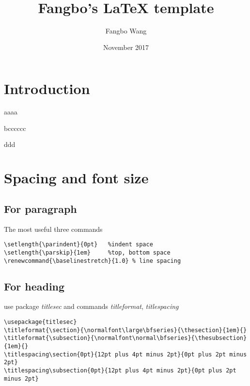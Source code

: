 \documentclass[12pt]{article}
\title{Fangbo's \LaTeX{} template}
\author{Fangbo Wang \\   }
\date{November 2017}
\renewcommand{\baselinestretch}{1.0} %
\begin{document}
\maketitle
\tableofcontents

\newpage
\section{Introduction}
aaaa 

bcccccc


ddd
\section{Spacing and font size}

\subsection{For paragraph}
The most useful three commands
\begin{lstlisting}
\setlength{\parindent}{0pt}   %indent space
\setlength{\parskip}{1em}     %top, bottom space
\renewcommand{\baselinestretch}{1.0} % line spacing
\end{lstlisting}

\subsection{For heading}
use package \textit{titlesec} and commands \textit{titleformat}, \textit{titlespacing}
\begin{lstlisting}
\usepackage{titlesec}
\titleformat{\section}{\normalfont\large\bfseries}{\thesection}{1em}{}
\titleformat{\subsection}{\normalfont\normal\bfseries}{\thesubsection}{1em}{}
\titlespacing\section{0pt}{12pt plus 4pt minus 2pt}{0pt plus 2pt minus 2pt}
\titlespacing\subsection{0pt}{12pt plus 4pt minus 2pt}{0pt plus 2pt minus 2pt}
\end{lstlisting}
\end{document}
